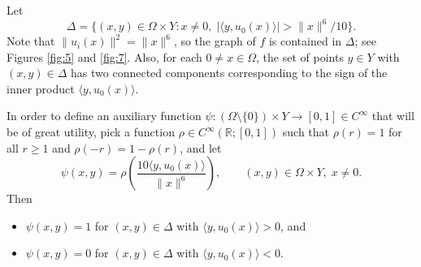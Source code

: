 \documentclass{article}
\newcommand{\R}{\mathbb{R}}
\theoremstyle{definition}
\theoremstyle{remark}
\newcommand{\uu}{u}
\begin{document}
Let
%
%
%
\begin{equation}\label{eq:Delta}
\Delta=\{(x,y)\in \Omega\times Y:x\neq0,\;|\langle y,\uu_0(x)\rangle|> \|x\|^6/10\}.
\end{equation}
Note that $\|\uu_i(x)\|^2=\|x\|^6$, so the graph of $f$ is contained in $\Delta$; see Figures \ref{fig:5} and \ref{fig:7}. Also, for each $0\neq x\in \Omega$, the set of points $y\in Y$ with $(x,y)\in \Delta$ has two connected components corresponding to the sign of the inner product $\langle y,\uu_0(x)\rangle$. 

In order to define an auxiliary function $\psi\colon(\Omega\setminus\{0\})\times Y\to[0,1]\in C^\infty$ that will be of great utility, pick a function $\rho\in C^\infty(\R;[0,1])$ such that $\rho(r)=1$ for all $r\geq 1$ and $\rho(-r)=1-\rho(r)$, and let
\[\psi(x,y)=\rho\left(\frac{10\langle y,\uu_0(x)\rangle}{\|x\|^6}\right),\qquad (x,y)\in\Omega\times Y,\;x\neq 0.\]
Then
\begin{itemize}
%
%
%
\item $\psi(x,y)=1$ for $(x,y)\in\Delta$ with $\langle y,\uu_0(x)\rangle>0$, and %
 \item $\psi(x,y)=0$ for $(x,y)\in\Delta$ with  $\langle y,\uu_0(x)\rangle<0$.%
%
%
%
%
%
%
%
%
%
\end{itemize}
\end{document}
